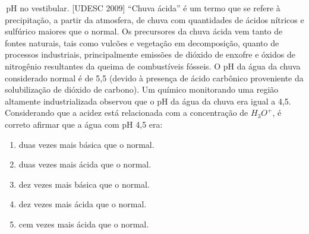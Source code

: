 \begin{task}{\,pH no vestibular.}
[UDESC 2009] “Chuva ácida” é um termo que se refere à precipitação, a partir da
atmosfera, de chuva com quantidades de ácidos nítricos e sulfúrico maiores que o
normal. Os precursores da chuva ácida vem tanto de fontes naturais, tais como vulcões
e vegetação em decomposição, quanto de processos industriais, principalmente
emissões de dióxido de enxofre e óxidos de nitrogênio resultantes da queima de
combustíveis fósseis. O pH da água da chuva considerado normal é de 5,5 (devido
à presença de ácido carbônico proveniente da solubilização de dióxido de carbono).
Um químico monitorando uma região altamente industrializada observou que o pH da
água da chuva era igual a 4,5. Considerando que a acidez está relacionada com a
concentração de $H_3O^+$, é correto afirmar que a água com pH 4,5 era:
\begin{enumerate}[itemsep=0pt]
\item duas vezes mais básica que o normal.
\item duas vezes mais ácida que o normal.
\item dez vezes mais básica que o normal.
\item dez vezes mais ácida que o normal.
\item cem vezes mais ácida que o normal.
\end{enumerate}
\end{task}

\clearmargin

\exercise

